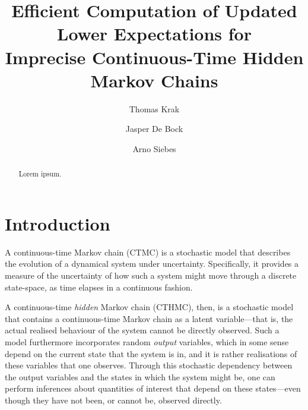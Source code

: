 \documentclass[twoside,11pt]{article}
\title{Efficient Computation of Updated Lower Expectations for\\ Imprecise Continuous-Time Hidden Markov Chains}
\author{Thomas Krak \and Jasper De Bock \and Arno Siebes}
\begin{document}


\date{}
\maketitle



\begin{abstract}
Lorem ipsum.
\end{abstract}

\section{Introduction}\label{sec:introduction}

A continuous-time Markov chain (CTMC) is a stochastic model that describes the evolution of a dynamical system under uncertainty. Specifically, it provides a measure of the uncertainty of how such a system might move through a discrete state-space, as time elapses in a continuous fashion.

A continuous-time \emph{hidden} Markov chain (CTHMC), then, is a stochastic model that contains a continuous-time Markov chain as a latent variable---that is, the actual realised behaviour of the system cannot be directly observed. Such a model furthermore incorporates random \emph{output} variables, which in some sense depend on the current state that the system is in, and it is rather realisations of these variables that one observes. Through this stochastic dependency between the output variables and the states in which the system might be, one can perform inferences about quantities of interest that depend on these states---even though they have not been, or cannot be, observed directly.
\end{document}
